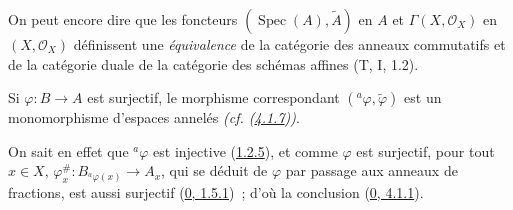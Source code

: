 On peut encore dire que les foncteurs $(\operatorname{Spec}(A),\widetilde A)$
en $A$ et $\Gamma(X,\mathscr{O}_X)$ en $(X,\mathscr{O}_X)$ définissent une
\emph{équivalence} de la catégorie des anneaux commutatifs et de la catégorie
duale de la catégorie des schémas affines (T, I, 1.2).

\begin{corollary}[1.7.5]
\label{I.1.7.5-fr}
Si $\varphi:B\to A$ est surjectif, le morphisme correspondant
$({}^a\varphi,\widetilde\varphi)$ est un monomorphisme d'espaces annelés
\emph{(cf. (\hyperref[I.4.1.7-fr]{4.1.7}))}.
\end{corollary}

On sait en effet que ${}^a\varphi$ est injective
(\hyperref[I.1.2.5-fr]{1.2.5}), et comme $\varphi$ est surjectif, pour tout
$x\in X$, $\varphi_x^{\#}:B_{{}^a\varphi(x)}\to A_x$, qui se déduit de
$\varphi$ par passage aux anneaux de fractions, est aussi surjectif
(\hyperref[0.1.5.1-fr]{0, 1.5.1})~; d'où la conclusion
(\hyperref[0.4.1.1-fr]{0, 4.1.1}).
